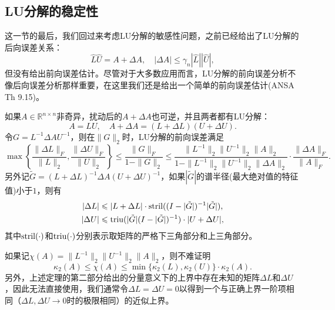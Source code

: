 \documentclass[a4paper,10pt]{ctexart}
\begin{document}
\subsection{LU分解的稳定性}
这一节的最后，我们回过来考虑LU分解的敏感性问题，之前已经给出了LU分解的后向误差关系：
\[
    \hat{L} \hat{U} = A + \Delta A,\quad |\Delta A| \leqslant \gamma_{n} |\hat{L}| |\hat{U}|,
\]
但没有给出前向误差估计。尽管对于大多数应用而言，LU分解的前向误差分析不像后向误差分析那样重要，在这里我们还是给出一个简单的前向误差估计(ANSA Th 9.15)。
\begin{theorem}
    如果$ A\in \mathbb{R}^{n\times n} $非奇异，扰动后的$ A+\Delta A $也可逆，并且两者都有LU分解：
    \[
        A = LU, \quad A+\Delta A = (L+\Delta L)(U +\Delta U).
    \]
    令$ G = L^{-1}\Delta A U^{-1} $，则在$ \| G \|_2 $时，LU分解的前向误差满足
    \begin{equation}
        \max\left\{ \frac{\| \Delta L \|_F }{\| L \|_2}, \frac{\| \Delta U \|_F }{\| U \|_2} \right\} 
        \leqslant \frac{\| G \|_F}{1-\| G \|_2}\leqslant 
        \frac{\| L^{-1} \|_2 \| U^{-1} \|_2 \| A \|_2}{1-\| L^{-1} \|_2 \| U^{-1} \|_2 \| \Delta A \|_2} \cdot \frac{\| \Delta A \|_F}{\| A \|_F}.
    \end{equation}
    另外记$ \tilde{G} = (L+\Delta L)^{-1} \Delta A (U+\Delta U)^{-1} $，如果$ |\tilde{G}| $的谱半径(最大绝对值的特征值)小于$ 1 $，则有
    \begin{equation}
        \begin{aligned}
            |\Delta L|&\leqslant |L+\Delta L|\cdot {\rm stril}((I-|\tilde{G}|)^{-1}|\tilde{G}|),\\
            |\Delta U|&\leqslant {\rm triu}(|\tilde{G}|(I-|\tilde{G}|)^{-1}) \cdot |U+\Delta U|,
        \end{aligned}
    \end{equation}
    其中$ {\rm stril}(\cdot) $和$ {\rm triu}(\cdot) $分别表示取矩阵的严格下三角部分和上三角部分。
\end{theorem}

如果记$ \chi(A) = \| L^{-1} \|_2 \| U^{-1} \|_2 \| A \|_2 $，则不难证明
\[
    \kappa_2(A)\leqslant \chi(A)\leqslant \min\{\kappa_2(L), \kappa_2(U)\}\cdot \kappa_2(A).
\]
另外，上述定理的第二部分给出的分量意义下的上界中存在未知的矩阵$ \Delta L $和$ \Delta U $，因此无法直接使用，我们通常令$ \Delta L = \Delta U = 0 $以得到一个与正确上界一阶项相同（$ \Delta L, \Delta U\to 0 $时的极限相同）的近似上界。
\end{document}

